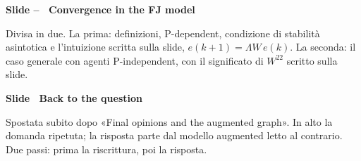 \par\addvspace{14pt}\noindent\begin{minipage}{\textwidth}
{\color{unipd}\bfseries Slide -- \textperiodcentered\ Convergence in the FJ model}\divisa\par\smallskip
{\small Divisa in due. La prima: definizioni, P-dependent, condizione di stabilità asintotica e l'intuizione scritta sulla slide, $e(k+1) = \Lambda W\, e(k)$. La seconda: il caso generale con agenti P-independent, con il significato di $W^{22}$ scritto sulla slide.}\par\smallskip
\noindent\begin{minipage}[t]{0.36\textwidth}\par
{}\par\smallskip
\end{minipage}\hfill\begin{minipage}[t]{0.61\textwidth}\par
{}\par\smallskip
{}\par\smallskip
\end{minipage}\par
\end{minipage}\par
\par\addvspace{14pt}\noindent\begin{minipage}{\textwidth}
{\color{unipd}\bfseries Slide  \textperiodcentered\ Back to the question}\spostata\par\smallskip
{\small Spostata subito dopo «Final opinions and the augmented graph». In alto la domanda ripetuta; la risposta parte dal modello augmented letto al contrario. Due passi: prima la riscrittura, poi la risposta.}\par\smallskip
\noindent\begin{minipage}[t]{0.36\textwidth}\par
{}\par\smallskip
\end{minipage}\hfill\begin{minipage}[t]{0.61\textwidth}\par
{}\par\smallskip
{}\par\smallskip
\end{minipage}\par
\end{minipage}\par
